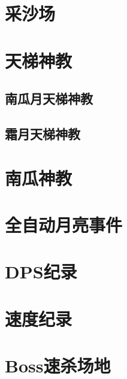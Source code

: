 \section{采沙场}

\section{天梯神教}
\subsection{南瓜月天梯神教}
\subsection{霜月天梯神教}

\section{南瓜神教}

\section{全自动月亮事件}

\section{DPS纪录}

\section{速度纪录}

\section{Boss速杀场地}
